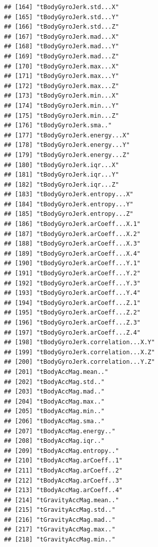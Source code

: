 \documentclass[
]{article}
\begin{document}
\begin{verbatim}
## [164] "tBodyGyroJerk.std...X"               
## [165] "tBodyGyroJerk.std...Y"               
## [166] "tBodyGyroJerk.std...Z"               
## [167] "tBodyGyroJerk.mad...X"               
## [168] "tBodyGyroJerk.mad...Y"               
## [169] "tBodyGyroJerk.mad...Z"               
## [170] "tBodyGyroJerk.max...X"               
## [171] "tBodyGyroJerk.max...Y"               
## [172] "tBodyGyroJerk.max...Z"               
## [173] "tBodyGyroJerk.min...X"               
## [174] "tBodyGyroJerk.min...Y"               
## [175] "tBodyGyroJerk.min...Z"               
## [176] "tBodyGyroJerk.sma.."                 
## [177] "tBodyGyroJerk.energy...X"            
## [178] "tBodyGyroJerk.energy...Y"            
## [179] "tBodyGyroJerk.energy...Z"            
## [180] "tBodyGyroJerk.iqr...X"               
## [181] "tBodyGyroJerk.iqr...Y"               
## [182] "tBodyGyroJerk.iqr...Z"               
## [183] "tBodyGyroJerk.entropy...X"           
## [184] "tBodyGyroJerk.entropy...Y"           
## [185] "tBodyGyroJerk.entropy...Z"           
## [186] "tBodyGyroJerk.arCoeff...X.1"         
## [187] "tBodyGyroJerk.arCoeff...X.2"         
## [188] "tBodyGyroJerk.arCoeff...X.3"         
## [189] "tBodyGyroJerk.arCoeff...X.4"         
## [190] "tBodyGyroJerk.arCoeff...Y.1"         
## [191] "tBodyGyroJerk.arCoeff...Y.2"         
## [192] "tBodyGyroJerk.arCoeff...Y.3"         
## [193] "tBodyGyroJerk.arCoeff...Y.4"         
## [194] "tBodyGyroJerk.arCoeff...Z.1"         
## [195] "tBodyGyroJerk.arCoeff...Z.2"         
## [196] "tBodyGyroJerk.arCoeff...Z.3"         
## [197] "tBodyGyroJerk.arCoeff...Z.4"         
## [198] "tBodyGyroJerk.correlation...X.Y"     
## [199] "tBodyGyroJerk.correlation...X.Z"     
## [200] "tBodyGyroJerk.correlation...Y.Z"     
## [201] "tBodyAccMag.mean.."                  
## [202] "tBodyAccMag.std.."                   
## [203] "tBodyAccMag.mad.."                   
## [204] "tBodyAccMag.max.."                   
## [205] "tBodyAccMag.min.."                   
## [206] "tBodyAccMag.sma.."                   
## [207] "tBodyAccMag.energy.."                
## [208] "tBodyAccMag.iqr.."                   
## [209] "tBodyAccMag.entropy.."               
## [210] "tBodyAccMag.arCoeff..1"              
## [211] "tBodyAccMag.arCoeff..2"              
## [212] "tBodyAccMag.arCoeff..3"              
## [213] "tBodyAccMag.arCoeff..4"              
## [214] "tGravityAccMag.mean.."               
## [215] "tGravityAccMag.std.."                
## [216] "tGravityAccMag.mad.."                
## [217] "tGravityAccMag.max.."                
## [218] "tGravityAccMag.min.."                

\end{verbatim}
\end{document}
